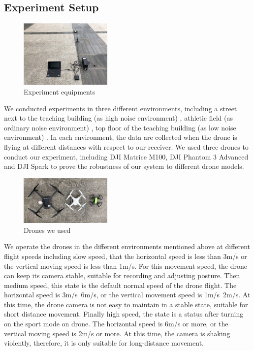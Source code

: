\documentclass{sig-alternate-10pt}
\begin{document}
\subsection{Experiment Setup}
\begin{figure}[!h]
	\centering
	\includegraphics[width=0.4\textwidth]{pics/exp.png}
	\caption{Experiment equipments}
	\label{exp}
\end{figure}

We conducted experiments in three different environments, including a street next to the teaching building (as high noise environment) , athletic field (as ordinary noise environment) , top floor of the teaching building (as low noise environment) . In each environment, the data are collected when the drone is flying at different distances with respect to our receiver. We used three drones to conduct our experiment, including DJI Matrice M100, DJI Phantom 3 Advanced and DJI Spark to prove the robustness of our system to different drone models. 



\begin{figure}[!h]
	\centering
	\includegraphics[width=0.4\textwidth]{pics/drones.png}
	\caption{Drones we used}
	\label{drones}
\end{figure}


\hspace{1mm} 
We operate the drones in the different environments mentioned above at different flight speeds including slow speed, that the horizontal speed is less than 3m/s or the vertical moving speed is less than 1m/s. For this movement speed, the drone can keep its camera stable, suitable for recording and adjusting posture. Then medium speed, this state is the default normal speed of the drone flight. The horizontal speed is 3m/s~6m/s, or the vertical movement speed is 1m/s~2m/s. At this time, the drone camera is not easy to maintain in a stable state, suitable for short distance movement. Finally high speed, the state is a status after turning on the sport mode on drone. The horizontal speed is 6m/s or more, or the vertical moving speed is 2m/s or more. At this time, the camera is shaking violently, therefore, it is only suitable for long-distance movement.
\end{document}
